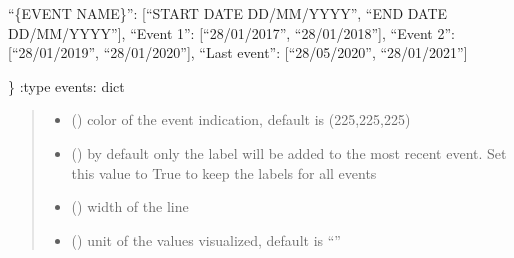 \documentclass[letterpaper,10pt,english]{sphinxmanual}
\begin{document}
\begin{fulllineitems}
\begin{quote}
\begin{description}
\end{description}\end{quote}
\begin{description}
\sphinxAtStartPar
“\{EVENT NAME\}”: {[}“START DATE DD/MM/YYYY”, “END DATE DD/MM/YYYY”{]},
“Event 1”: {[}“28/01/2017”, “28/01/2018”{]},
“Event 2”: {[}“28/01/2019”, “28/01/2020”{]},
“Last event”: {[}“28/05/2020”, “28/01/2021”{]}

\end{description}

\sphinxAtStartPar
\}
:type events: dict
\begin{quote}\begin{description}
\begin{itemize}
\item {} 
\sphinxAtStartPar
{} () \textendash{} color of the event indication, default is (225,225,225)

\item {} 
\sphinxAtStartPar
{} () \textendash{} by default only the label will be added to the most recent event. Set this value to True to keep the labels for all events

\item {} 
\sphinxAtStartPar
{} () \textendash{} width of the line

\item {} 
\sphinxAtStartPar
{} () \textendash{} unit of the values visualized, default is “”

\end{itemize}

\end{description}\end{quote}

\begin{fulllineitems}
\label{\detokenize{index:sjvisualizer.LineChart.line_chart.draw}}
\pysigstartsignatures
{}
\pysigstopsignatures
\end{fulllineitems}


\end{fulllineitems}
\end{document}
